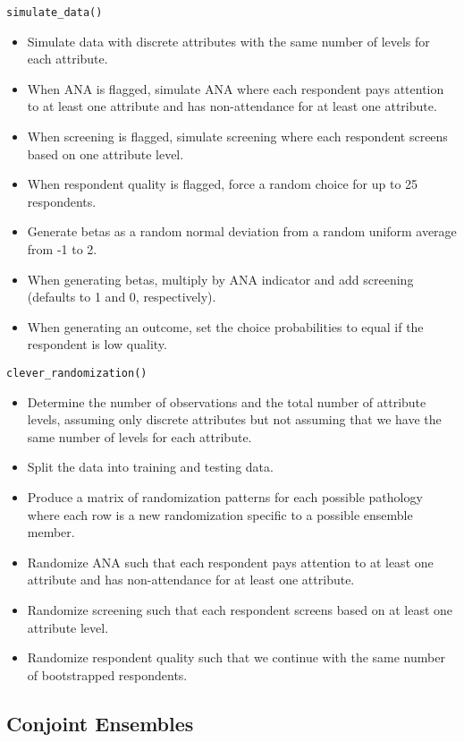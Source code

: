 \documentclass[12pt,titlepage]{mktg-article}
\begin{document}
\texttt{simulate\_data()}

\begin{itemize}
\tightlist
\item
  Simulate data with discrete attributes with the same number of levels for each attribute.
\item
  When ANA is flagged, simulate ANA where each respondent pays attention to at least one attribute and has non-attendance for at least one attribute.
\item
  When screening is flagged, simulate screening where each respondent screens based on one attribute level.
\item
  When respondent quality is flagged, force a random choice for up to 25 respondents.
\item
  Generate betas as a random normal deviation from a random uniform average from -1 to 2.
\item
  When generating betas, multiply by ANA indicator and add screening (defaults to 1 and 0, respectively).
\item
  When generating an outcome, set the choice probabilities to equal if the respondent is low quality.
\end{itemize}

\texttt{clever\_randomization()}

\begin{itemize}
\tightlist
\item
  Determine the number of observations and the total number of attribute levels, assuming only discrete attributes but not assuming that we have the same number of levels for each attribute.
\item
  Split the data into training and testing data.
\item
  Produce a matrix of randomization patterns for each possible pathology where each row is a new randomization specific to a possible ensemble member.
\item
  Randomize ANA such that each respondent pays attention to at least one attribute and has non-attendance for at least one attribute.
\item
  Randomize screening such that each respondent screens based on at least one attribute level.
\item
  Randomize respondent quality such that we continue with the same number of bootstrapped respondents.
\end{itemize}

\hypertarget{conjoint-ensembles}{%
\subsection{Conjoint Ensembles}\label{conjoint-ensembles}}
\end{document}
